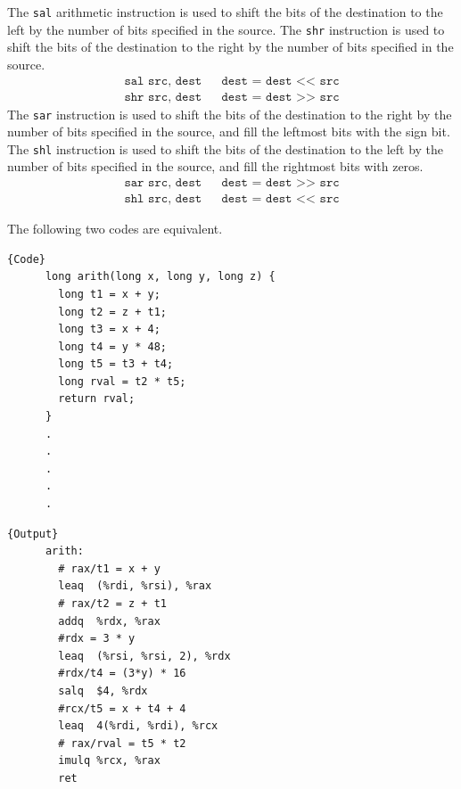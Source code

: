 \documentclass{article}
\begin{document}
  \begin{definition}
    The \texttt{sal} arithmetic instruction is used to shift the bits of the destination to the left by the number of bits specified in the source. The \texttt{shr} instruction is used to shift the bits of the destination to the right by the number of bits specified in the source.
    \begin{align*}
      \texttt{sal src, dest} && \texttt{dest = dest << src}  \\
      \texttt{shr src, dest} && \texttt{dest = dest >> src}
    \end{align*}
    The \texttt{sar} instruction is used to shift the bits of the destination to the right by the number of bits specified in the source, and fill the leftmost bits with the sign bit. The \texttt{shl} instruction is used to shift the bits of the destination to the left by the number of bits specified in the source, and fill the rightmost bits with zeros. 
    \begin{align*}
      \texttt{sar src, dest} && \texttt{dest = dest >> src}  \\
      \texttt{shl src, dest} && \texttt{dest = dest << src}
    \end{align*}
  \end{definition}

  \begin{example}
    The following two codes are equivalent. 

    \noindent\begin{minipage}{.5\textwidth}
    \begin{lstlisting}[]{Code}
      long arith(long x, long y, long z) {
        long t1 = x + y; 
        long t2 = z + t1; 
        long t3 = x + 4; 
        long t4 = y * 48; 
        long t5 = t3 + t4;
        long rval = t2 * t5; 
        return rval; 
      }
      .
      .
      .
      .
      .
    \end{lstlisting}
    \end{minipage}
    \hfill
    \begin{minipage}{.49\textwidth}
    \begin{lstlisting}[]{Output}
      arith: 
        # rax/t1 = x + y
        leaq  (%rdi, %rsi), %rax
        # rax/t2 = z + t1
        addq  %rdx, %rax
        #rdx = 3 * y 
        leaq  (%rsi, %rsi, 2), %rdx
        #rdx/t4 = (3*y) * 16
        salq  $4, %rdx 
        #rcx/t5 = x + t4 + 4
        leaq  4(%rdi, %rdi), %rcx 
        # rax/rval = t5 * t2
        imulq %rcx, %rax 
        ret 
    \end{lstlisting}
    \end{minipage}
  \end{example}
\end{document}
